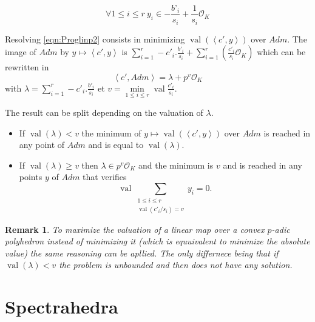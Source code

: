 \documentclass[a4paper,12pt]{article}
\newtheorem{remark}{Remark}
\DeclareMathOperator{\val}{val}
\newcommand{\OK}{\mathcal{O}_K}
\begin{document}
\begin{equation}
	\forall 1 \le i\le r  \ y_i \in -\frac{b’_i}{s_i} + \frac{1}{s_i} \OK
\end{equation}


Resolving \ref{eqn:Proglinp2} consists in minimizing $\val\left(\left<c',y \right>\right)$ over $Adm$. The image of $Adm$ by $y \mapsto \left<c',y \right>$ is $\sum_{i=1}^r -c'_i.\frac{b'_i}{s_i} + \sum_{i=1}^r\left( \frac{c'_i}{s_{i}} \OK \right)$ which can be rewritten in 
$$\left<c',Adm \right> = \lambda + p^{v} \OK$$
with $\lambda = \sum\limits_{i=1}^r -c'_i.\frac{b'_i}{s_i}$ et $v = \min\limits_{1\le i\le r} \val \frac{c'_{i}}{s_{i}} $.

The result can be split depending on the valuation of $\lambda$.
\begin{itemize}
	\item If $\val( \lambda) < v$ the minimum of $y\mapsto \val\left(\left<c',y \right>\right)$ over $Adm$ is reached in any point of $Adm$ and is equal to $\val\left( \lambda\right)$.
	\item If $\val\left( \lambda \right) \ge v$ then $\lambda \in p^{v} \OK$ and the minimum is $v $ and is reached in any points $y$ of $Adm$ that verifies 
	$$\val\sum \limits_{\begin{array}{c} 1\le i\le r\\ \val\left(c'_{i}/{s_{i}} \right) = v  \end{array}   } y_{i} = 0.$$ 
	
\end{itemize}
\begin{remark}
	To maximize the valuation of a linear map over a convex $p$-adic polyhedron instead of minimizing it (which is equuivalent to minimize the absolute value) the same reasoning can be apllied. The only differnece being that if $\val\left( \lambda\right) < v$ the problem is unbounded and then does not have any solution. 
\end{remark}




\section{Spectrahedra}
\end{document}
